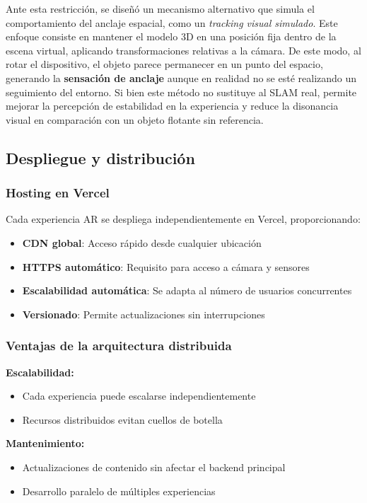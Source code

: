 Ante esta restricción, se diseñó un mecanismo alternativo que simula el comportamiento del anclaje espacial, como un \textit{tracking visual simulado}. Este enfoque consiste en mantener el modelo 3D en una posición fija dentro de la escena virtual, aplicando transformaciones relativas a la cámara. De este modo, al rotar el dispositivo, el objeto parece permanecer en un punto del espacio, generando la \textbf{sensación de anclaje} aunque en realidad no se esté realizando un seguimiento del entorno. Si bien este método no sustituye al SLAM real, permite mejorar la percepción de estabilidad en la experiencia y reduce la disonancia visual en comparación con un objeto flotante sin referencia.



\subsection{Despliegue y distribución}


\subsubsection{Hosting en Vercel}


Cada experiencia AR se despliega independientemente en Vercel, proporcionando:
\begin{itemize}
    \item \textbf{CDN global}: Acceso rápido desde cualquier ubicación
    \item \textbf{HTTPS automático}: Requisito para acceso a cámara y sensores
    \item \textbf{Escalabilidad automática}: Se adapta al número de usuarios concurrentes
    \item \textbf{Versionado}: Permite actualizaciones sin interrupciones
\end{itemize}


\subsubsection{Ventajas de la arquitectura distribuida}


\textbf{Escalabilidad:}
\begin{itemize}
    \item Cada experiencia puede escalarse independientemente
    \item Recursos distribuidos evitan cuellos de botella
\end{itemize}


\textbf{Mantenimiento:}
\begin{itemize}
    \item Actualizaciones de contenido sin afectar el backend principal
    \item Desarrollo paralelo de múltiples experiencias
\end{itemize}


